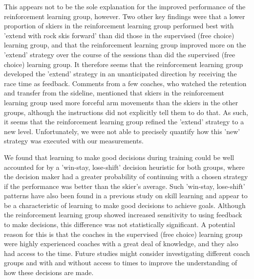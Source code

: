 \documentclass[pdflatex,sn-nature]{sn-jnl}%
\theoremstyle{thmstyleone}%
\theoremstyle{thmstyletwo}%
\theoremstyle{thmstylethree}%
\begin{document}
This appears not to be the sole explanation for the improved performance of the reinforcement learning group, however. Two other key findings were that a lower proportion of skiers in the reinforcement learning group performed best with 'extend with rock skis forward' than did those in the supervised (free choice) learning group, and that the reinforcement learning group improved more on the 'extend' strategy over the course of the sessions than did the supervised (free choice) learning group. It therefore seems that the reinforcement learning group developed the 'extend' strategy in an unanticipated direction by receiving the race time as feedback. Comments from a few coaches, who watched the retention and transfer from the sideline, mentioned that skiers in the reinforcement learning group used more forceful arm movements than the skiers in the other groups, although the instructions did not explicitly tell them to do that. As such, it seems that the reinforcement learning group refined the 'extend' strategy to a new level. Unfortunately, we were not able to precisely quantify how this 'new' strategy was executed with our measurements.

We found that learning to make good decisions during training could be well accounted for by a 'win-stay, lose-shift' decision heuristic for both groups, where the decision maker had a greater probability of continuing with a chosen strategy if the performance was better than the skier's average. Such 'win-stay, lose-shift' patterns have also been found in a previous study on skill learning \cite{jordan_a_taylor_explicit_2014} and appear to be a characteristic of learning to make good decisions to achieve goals. Although the reinforcement learning group showed increased sensitivity to using feedback to make decisions, this difference was not statistically significant. A potential reason for this is that the coaches in the supervised (free choice) learning group were highly experienced coaches with a great deal of knowledge, and they also had access to the time. Future studies might consider investigating different coach groups and with and without access to times to improve the understanding of how these decisions are made.
\end{document}
